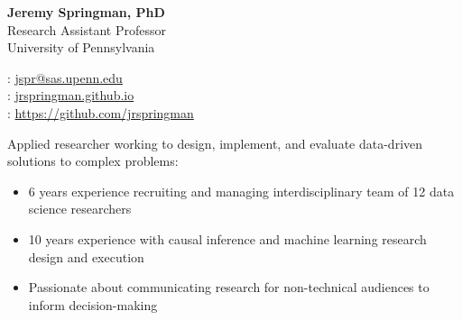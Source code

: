 \documentclass[11pt]{article}
\renewcommand{\today}{\monthname[\the\month] \the\year}
\begin{document}
\thispagestyle{empty}



\begin{multicols}{2}
{\Large {\bf Jeremy Springman, PhD}}\\
Research Assistant Professor\\
University of Pennsylvania\\

\columnbreak
\begin{flushright}

\faEnvelope: \href{mailto:jspr@sas.upenn.edu}{jspr@sas.upenn.edu}\\
\faLaptop: \url{jrspringman.github.io}\\
\faGithub: \url{https://github.com/jrspringman}\\
\end{flushright}
\end{multicols}
\vspace{-10pt}

Applied researcher working to design, implement, and evaluate data-driven solutions to complex problems:
\begin{itemize}[itemsep=0mm, parsep=0pt]
\item 6 years experience recruiting and managing interdisciplinary team of 12 data science researchers
\item 10 years experience with causal inference and machine learning research design and execution
\item Passionate about communicating research for non-technical audiences to inform decision-making
\end{itemize}
\end{document}
